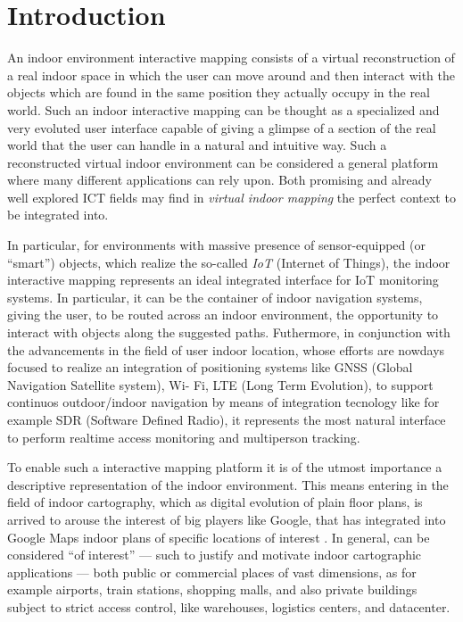 \section{Introduction}\label{introduction}

An indoor environment interactive mapping consists of a virtual reconstruction
of a real indoor space in which the user can move around and then interact
with the objects which are found in the same position they actually occupy in the
real world. Such an indoor interactive mapping can be thought as a specialized
and very evoluted user interface capable of giving a glimpse of a section of
the real world that the user can handle in a natural and intuitive way.  Such
a reconstructed virtual indoor environment can be considered a general
platform where many different applications can rely upon. Both promising and
already well explored ICT fields may find in \emph{virtual indoor mapping} the
perfect context to be integrated into.

In particular, for environments with massive presence of sensor-equipped (or
``smart'') objects, which realize the so-called \emph{IoT} (Internet of
Things), the indoor interactive mapping represents an ideal integrated
interface for IoT monitoring systems. In particular, it can be the container
of indoor navigation systems, giving the user, to be routed across an indoor
environment, the opportunity to interact with objects along the suggested
paths. Futhermore, in conjunction with the advancements in the field of user
indoor location, whose efforts are nowdays focused to realize an integration
of positioning systems like GNSS (Global Navigation Satellite system), Wi- Fi,
LTE (Long Term Evolution), to support continuos outdoor/indoor navigation by
means of integration tecnology like for example SDR (Software Defined Radio),
it represents the most natural interface to perform realtime access monitoring
and multiperson tracking.

To enable such a interactive mapping platform it is of the utmost importance a
descriptive representation of the indoor environment. This means entering in
the field of indoor cartography, which as digital evolution of plain floor
plans, is arrived to arouse the interest of big players like Google, that has
integrated into Google Maps indoor plans of specific locations of interest
\cite{indoormaps}. In general, can be considered ``of interest'' --- such to
justify and motivate indoor cartographic applications --- both public or
commercial places of vast dimensions, as for example airports, train stations,
shopping malls, and also private buildings subject to strict access control,
like warehouses, logistics centers, and datacenter.

